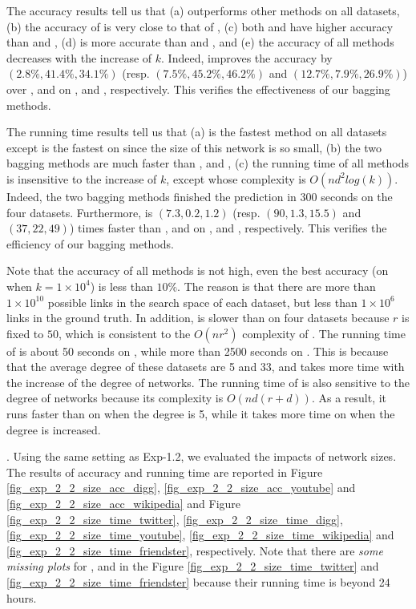 The accuracy results tell us that (a) \Biased outperforms other methods on all datasets,
(b) the accuracy of \Biasedp is very close to that of \Biased, (c) both
\Biased and \Biasedp have higher accuracy than \Aa and \BIGCLAM, (d) \NMF is more accurate
than \Aa and \BIGCLAM, and (e) the accuracy of all methods decreases with the increase of $k$.
Indeed, \Biased improves the accuracy by $(2.8\%, 41.4\%, 34.1\%)$ (resp. $(7.5\%, 45.2\%, 46.2\%)$
and $(12.7\%, 7.9\%, 26.9\%)$) over \NMF, \Aa and \BIGCLAM on \Digg, \YouTube and \Wikipedia,
respectively. This verifies the effectiveness of our bagging methods.


The running time results tell us that (a) \Biasedp is the fastest method on all
datasets except \Aa is the fastest on \Digg since the size of this network is so
small, (b) the two bagging methods are much faster than \NMF, \Aa and \BIGCLAM,
(c) the running time of all methods is insensitive to the increase of $k$,
except \Aa whose complexity is $O(nd^2log(k))$.
Indeed, the two bagging methods finished the prediction in 300 seconds on the four datasets.
Furthermore, \Biasedp is $(7.3, 0.2, 1.2)$ (resp. $(90, 1.3, 15.5)$ and $(37, 22, 49)$)
times faster than \NMF, \Aa and \BIGCLAM on
\Digg, \YouTube and \Wikipedia, respectively.
This verifies the efficiency of our bagging methods.


Note that the accuracy of all methods is not high, even the best
accuracy (\Biasedp on \Digg when $k = 1\times 10^4$) is less than $10\%$. The reason is that
there are more than $1\times 10^{10}$ possible links in the search space of each dataset,
but less than $1\times 10^6$ links in the ground truth.
In addition, \NMF is slower than \Aa on four datasets because $r$ is fixed to $50$,
which is consistent to the $O(nr^2)$ complexity of \NMF.
The running time of \Aa is about 50 seconds on \YouTube,
while more than 2500 seconds on \Wikipedia.
This is because that the average degree of these datasets are 5 and 33,
and \Aa takes more time with the increase of the degree of networks.
The running time of \BIGCLAM is also sensitive to the degree of networks because its complexity is $O(nd(r + d))$.
As a result, it runs faster than
\NMF on \YouTube when the degree is 5, while it takes more time on \Wikipedia
when the degree is increased.








. Using the same setting as Exp-1.2, we
evaluated the impacts of network sizes. The results of accuracy and running time
are reported in Figure \ref{fig_exp_2_2_size_acc_digg}, \ref{fig_exp_2_2_size_acc_youtube} and
\ref{fig_exp_2_2_size_acc_wikipedia}
and Figure \ref{fig_exp_2_2_size_time_twitter}, \ref{fig_exp_2_2_size_time_digg}, 
\ref{fig_exp_2_2_size_time_youtube}, \ref{fig_exp_2_2_size_time_wikipedia} and
\ref{fig_exp_2_2_size_time_friendster}, respectively.
Note that there are {\em some missing plots} for \NMF, \Aa and
\BIGCLAM in the Figure \ref{fig_exp_2_2_size_time_twitter} and
\ref{fig_exp_2_2_size_time_friendster} because their running time
is beyond 24 hours.



